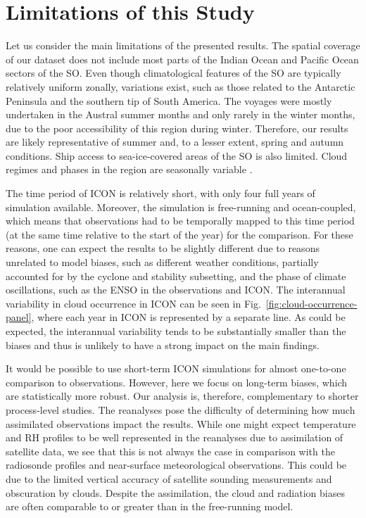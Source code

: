 \documentclass[draft]{agujournal2019}
\begin{document}
\section{Limitations of this Study}
\label{sec:limitations}

Let us consider the main limitations of the presented results. The spatial coverage of our dataset does not include most parts of the Indian Ocean and Pacific Ocean sectors of the SO. Even though climatological features of the SO are typically relatively uniform zonally, variations exist, such as those related to the Antarctic Peninsula and the southern tip of South America. The voyages were mostly undertaken in the Austral summer months and only rarely in the winter months, due to the poor accessibility of this region during winter. Therefore, our results are likely representative of summer and, to a lesser extent, spring and autumn conditions. Ship access to sea-ice-covered areas of the SO is also limited. Cloud regimes and phases in the region are seasonally variable \cite{danker2022}.

The time period of ICON is relatively short, with only four full years of simulation available. Moreover, the simulation is free-running and ocean-coupled, which means that observations had to be temporally mapped to this time period (at the same time relative to the start of the year) for the comparison. For these reasons, one can expect the results to be slightly different due to reasons unrelated to model biases, such as different weather conditions, partially accounted for by the cyclone and stability subsetting, and the phase of climate oscillations, such as the ENSO in the observations and ICON. The interannual variability in cloud occurrence in ICON can be seen in Fig.~\ref{fig:cloud-occurrence-panel}, where each year in ICON is represented by a separate line. As could be expected, the interannual variability tends to be substantially smaller than the biases and thus is unlikely to have a strong impact on the main findings.

It would be possible to use short-term ICON simulations for almost one-to-one comparison to observations. However, here we focus on long-term biases, which are statistically more robust. Our analysis is, therefore, complementary to shorter process-level studies. The reanalyses pose the difficulty of determining how much assimilated observations impact the results. While one might expect temperature and RH profiles to be well represented in the reanalyses due to assimilation of satellite data, we see that this is not always the case in comparison with the radiosonde profiles and near-surface meteorological observations. This could be due to the limited vertical accuracy of satellite sounding measurements and obscuration by clouds. Despite the assimilation, the cloud and radiation biases are often comparable to or greater than in the free-running model.
\end{document}
